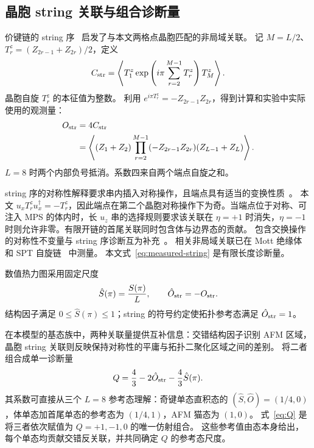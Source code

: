 \subsection{晶胞 string 关联与组合诊断量}
\label{sec:heatmaps}

价键链的 string 序~\cite{dennijs1989preroughening} 启发了与本文两格点晶胞匹配的非局域关联。
记 $M=L/2$、$T_r^z=(Z_{2r-1}+Z_{2r})/2$，定义
\begin{equation}
C_{\rm str}=
\left\langle T_1^z
\exp\left(i\pi\sum_{r=2}^{M-1}T_r^z\right)T_M^z\right\rangle.
\label{eq:cell-string}
\end{equation}
晶胞自旋 $T_r^z$ 的本征值为整数。
利用 $e^{i\pi T_r^z}=-Z_{2r-1}Z_{2r}$，得到计算和实验中实际使用的观测量：
\begin{align}
O_{\rm str}&=4C_{\rm str}\nonumber\\
&=\left\langle (Z_1+Z_2)
\prod_{r=2}^{M-1}(-Z_{2r-1}Z_{2r})
(Z_{L-1}+Z_L)\right\rangle.
\label{eq:measured-string}
\end{align}
$L=8$ 时两个内部负号抵消。系数四来自两个端点自旋之和。

string 序的对称性解释要求串内插入对称操作，且端点具有适当的变换性质~\cite{perezgarcia2008string,pollmann2012detection}。
本文 $u_xT_r^zu_x^\dagger=-T_r^z$，因此端点在第二个晶胞对称操作下为奇。当端点位于对称、可注入 MPS 的体内时，长 $u_z$ 串的选择规则要求该关联在 $\eta=+1$ 时消失，$\eta=-1$ 时则允许非零。有限开链的首尾关联同时包含体与边界态的贡献。
包含交换操作的对称性不变量与 string 序诊断互为补充~\cite{haegeman2012order}。
相关非局域关联已在 Mott 绝缘体~\cite{endres2011observation} 和 SPT 自旋链~\cite{tan2023realizing} 中测量。
本文式~\eqref{eq:measured-string} 是有限长度诊断量。

数值热力图采用固定尺度
\begin{equation}
\hat S(\pi)=\frac{S(\pi)}{L},\qquad
\hat O_{\rm str}=-O_{\rm str}.
\label{eq:fixed-scales}
\end{equation}
结构因子满足 $0\leq\hat S(\pi)\leq1$；string 的符号约定使拓扑参考态满足 $\hat O_{\rm str}=1$。

在本模型的基态族中，两种关联量提供互补信息：交错结构因子识别 AFM 区域，晶胞 string 关联则反映保持对称性的平庸与拓扑二聚化区域之间的差别。
将二者组合成单一诊断量
\begin{equation}
Q=\frac43-2\hat O_{\rm str}-\frac43\hat S(\pi).
\label{eq:Q}
\end{equation}
其系数可直接从三个 $L=8$ 参考态理解：奇键单态直积态的 $(\hat S,\hat O)=(1/4,0)$，体单态加首尾单态的参考态为 $(1/4,1)$，AFM 猫态为 $(1,0)$。
式~\eqref{eq:Q} 是将三者依次赋值为 $Q=+1,-1,0$ 的唯一仿射组合。
这些参考值由态本身给出，每个单态均贡献交错反关联，并共同确定 $Q$ 的参考态尺度。

